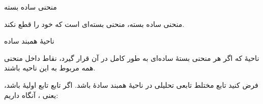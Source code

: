 \EMhold


\begin{EMdefinition}{منحنی ساده بسته}

منحنی ساده بسته، منحنی بسته‌ای است که خود را قطع نکند.

\end{EMdefinition}

\begin{EMunit}


\end{EMunit}

\begin{EMdefinition}{ناحیهٔ همبند ساده}

ناحیهٔ  که اگر هر منحنی بستهٔ ساده‌ای به طور کامل در آن قرار گیرد، نقاط داخل منحنی همه مربوط به این ناحیه باشند.

\end{EMdefinition}

\begin{EMunit}


\end{EMunit}

\EMhold


\begin{EMtheorem}{}

فرض کنید تابع مختلط  تابعی تحلیلی در ناحیهٔ همبند سادهٔ  باشد. اگر تابع  تابع اولیهٔ  باشد، یعنی ، آنگاه داریم:

\end{EMtheorem}

\begin{EMexample}{}


\end{EMexample}

\begin{EMexample}{}


\end{EMexample}

